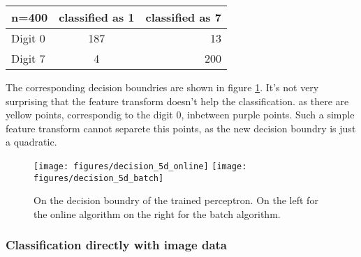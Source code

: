 \begin{tabular}{ l | c | r }
\centering
  n=400 & classified as 1 & classified as 7 \\ \hline
  Digit 0 & 187 & 13 \\
  Digit 7 & 4 & 200 \\
\end{tabular}

The corresponding decision boundries are shown in figure \ref{perceptron:decision:5d}. It's not very surprising that the feature transform doesn't help the classification. as there are yellow points, correspondig to the digit 0, inbetween purple points. Such a simple feature transform cannot separete this points, as the new decision boundry is just a quadratic.

\begin{figure}
\texttt{[image: figures/decision\_5d\_online]}
\texttt{[image: figures/decision\_5d\_batch]}
\caption{On the decision boundry of the trained perceptron. On the left for the online algorithm on the right for the batch algorithm.}
\label{perceptron:decision:5d}
\end{figure}

\subsubsection{Classification directly with image data}
